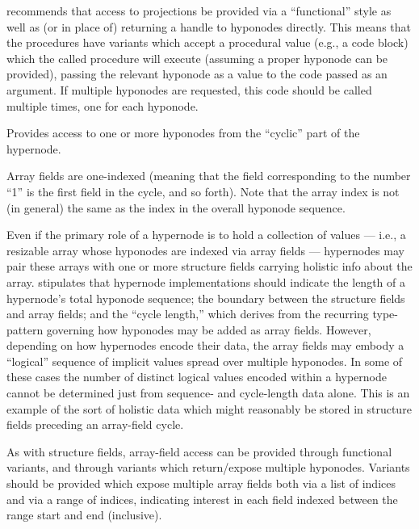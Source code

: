 \documentclass[12pt,letterpaper]{article}
\newcommand{\procitem}[1]{{#1}}
\newcommand{\lHGDM}{\resizebox{!}{8.5pt}{\ATexttclr{H}}%
\resizebox{!}{7.5pt}{\ATexttclr{GDM}}}
\newcommand{\ATexttclr}[1]{\textcolor{tcolor}{\textbf{#1}}}
\newcommand{\q}[1]{{\fontfamily{qcr}\selectfont ``}#1{\fontfamily{qcr}\selectfont ''}}
\begin{document}
{{\begin{description}
\descindent{}  \lHGDM{} recommends that access to 
projections be provided via a \q{functional} style 
as well as (or in place of) returning a handle to 
hyponodes directly.  This means that the procedures 
have variants which accept a procedural value 
(e.g., a code block) which the called procedure 
will execute (assuming a proper hyponode can be provided), 
passing the relevant hyponode as a value to the 
code passed as an argument.  If multiple hyponodes 
are requested, this code should be called multiple 
times, one for each hyponode.  

\item[\procitem{get\_array\_field(...)}, 
\procitem{get\_array\_fields(...)}]  Provides 
access to one or more hyponodes from the 
\q{cyclic} part of the hypernode.

\descindent{}  Array fields are one-indexed 
(meaning that the field corresponding to the 
number \q{1} is the first field in the cycle, 
and so forth).  Note that the array index 
is not (in general) the same as the index 
in the overall hyponode sequence.

\descindent{}  Even if the primary role of a hypernode 
is to hold a collection of values --- i.e., 
a resizable array whose hyponodes are indexed 
via array fields --- hypernodes may pair these 
arrays with one or more structure fields 
carrying holistic info about the array.  \lHGDM{} 
stipulates that hypernode implementations should 
indicate the length of a hypernode's total hyponode 
sequence; the boundary between the structure fields 
and array fields; and the \q{cycle length,} which 
derives from the recurring type-pattern governing 
how hyponodes may be added as array fields.  
However, depending on how hypernodes encode their
data, the array fields may embody a \q{logical} 
sequence of implicit values spread over multiple 
hyponodes.  In some of these cases the number of distinct 
logical values encoded within a hypernode cannot 
be determined just from sequence- and cycle-length 
data alone.  This is an example of the sort of 
holistic data which might reasonably be stored 
in structure fields preceding an array-field cycle.

\descindent{}  As with structure fields, array-field 
access can be provided through functional variants, 
and through variants which return/expose multiple 
hyponodes.  Variants should be provided which expose 
multiple array fields both via a list of indices 
and via a range of indices, indicating interest 
in each field indexed between the range start and end (inclusive). 


\end{description}}}
\end{document}
